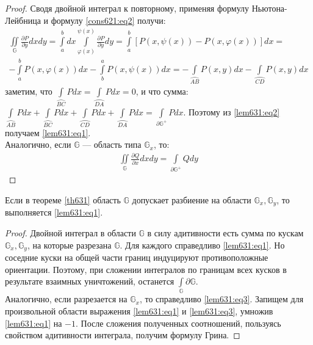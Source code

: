 \begin{proof}
  Сводя двойной интеграл к повторному, применяя формулу Ньютона-Лейбница и
  формулу \eqref{cons621:eq2} получи:
  \begin{gather}
    \iint\limits_{\mathbb{G}} \frac{\partial P}{\partial y} dx dy =
    \int\limits_a^b dx \int\limits_{\varphi(x)}^{\psi(x)} \frac{\partial
    P}{\partial y} dy = \int\limits_a^b \left[P(x, \psi(x)) - P(x,
    \varphi(x))\right] dx = \\
    -\int\limits_a^b P(x, \varphi(x)) dx - \int\limits_b^a P(x, \psi(x)) dx =
    -\int\limits_{\wideparen{AB}} P(x, y) dx - \int\limits_{\wideparen{CD}}
    P(x, y) dx
    \label{lem631:eq2}
  \end{gather}
  заметим, что $\int\limits_{\wideparen{BC}} Pdx = \int\limits_{\wideparen{DA}}
  Pdx = 0$, и что сумма: $\int\limits_{\wideparen{AB}} Pdx +
  \int\limits_{\wideparen{BC}} Pdx + \int\limits_{\wideparen{CD}} Pdx +
  \int\limits_{\wideparen{DA}} Pdx = \int\limits_{\partial \mathbb{G}^+} Pdx$.
  Поэтому из \eqref{lem631:eq2} получаем \eqref{lem631:eq1}. \\
  Аналогично, если $\mathbb{G}$ --- область типа $\mathbb{G}_x$, то:
  \begin{gather}
    \iint\limits_{\mathbb{G}} \frac{\partial Q}{\partial x} dx dy =
    \int\limits_{\partial \mathbb{G}^+} Qdy
    \label{lem631:eq3}
  \end{gather}
\end{proof}

\begin{lemma}
  Если в теореме \eqref{th631} область $\mathbb{G}$ допускает разбиение на
  области $\mathbb{G}_x, \mathbb{G}_y$, то выполняется \eqref{lem631:eq1}.
\end{lemma}

\begin{proof}
  Двойной интеграл в области $\mathbb{G}$ в силу адитивности есть сумма по
  кускам $\mathbb{G}_x, \mathbb{G}_y$, на которые разрезана $\mathbb{G}$. Для
  каждого справедливо \eqref{lem631:eq1}. Но соседние куски на общей части
  границ индуцируют противоположные ориентации. Поэтому, при сложении
  интегралов по границам всех кусков в результате взаимных уничтожений,
  останется $\int\limits_{\mathbb{G}} \partial \mathbb{G}$. \\
  Аналогично, если разрезается на $\mathbb{G}_x$, то справедливо
  \eqref{lem631:eq3}. Запищем для произвольной области выражения
  \eqref{lem631:eq1} и \eqref{lem631:eq3}, умножив \eqref{lem631:eq1} на $-1$.
  После сложения полученных соотношений, пользуясь свойством адитивности
  интеграла, получим формулу Грина.
\end{proof}

